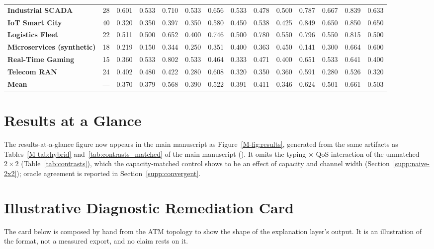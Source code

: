 \documentclass[preprint,3p]{elsarticle}
\begin{document}
\begin{table}[htbp]
{\begin{tabular}{lrcccccccccccc}
\textbf{Industrial SCADA} & 28 & 0.601 & 0.533 & 0.710 & 0.533 & 0.656 & 0.533 & 0.478 & 0.500 & 0.787 & 0.667 & 0.839 & 0.633 \\
\textbf{IoT Smart City} & 40 & 0.320 & 0.350 & 0.397 & 0.350 & 0.580 & 0.450 & 0.538 & 0.425 & 0.849 & 0.650 & 0.850 & 0.650 \\
\textbf{Logistics Fleet} & 22 & 0.511 & 0.500 & 0.652 & 0.400 & 0.746 & 0.500 & 0.780 & 0.550 & 0.796 & 0.550 & 0.815 & 0.500 \\
\textbf{Microservices (synthetic)} & 18 & 0.219 & 0.150 & 0.344 & 0.250 & 0.351 & 0.400 & 0.363 & 0.450 & 0.141 & 0.300 & 0.664 & 0.600 \\
\textbf{Real-Time Gaming} & 15 & 0.360 & 0.533 & 0.802 & 0.533 & 0.464 & 0.333 & 0.471 & 0.400 & 0.651 & 0.533 & 0.641 & 0.400 \\
\textbf{Telecom RAN} & 24 & 0.402 & 0.480 & 0.422 & 0.280 & 0.608 & 0.320 & 0.350 & 0.360 & 0.591 & 0.280 & 0.526 & 0.320 \\
\midrule
\textbf{Mean} & — & 0.370 & 0.379 & 0.568 & 0.390 & 0.522 & 0.391 & 0.411 & 0.346 & 0.624 & 0.501 & 0.661 & 0.503 \\
\bottomrule
\end{tabular}%
}
\end{table}

\section{Results at a Glance}
\label{supp:glance}

The results-at-a-glance figure now appears in the main manuscript as Figure~\ref{M-fig:results}, generated from the same artifacts as Tables~\ref{M-tab:hybrid} and~\ref{tab:contrasts_matched} of the main manuscript (). It omits the typing $\times$ QoS interaction of the unmatched $2\times2$ (Table~\ref{tab:contrasts}), which the capacity-matched control shows to be an effect of capacity and channel width (Section~\ref{supp:naive-2x2}); oracle agreement is reported in Section~\ref{supp:convergent}.

\section{Illustrative Diagnostic Remediation Card}
\label{supp:card}

The card below is composed by hand from the ATM topology to show the shape of the explanation layer's output. It is an illustration of the format, not a measured export, and no claim rests on it.
\end{document}
